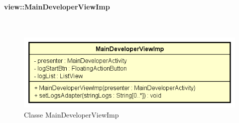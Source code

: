 \documentclass[../DefinizioneDiProdotto.tex]{subfiles}
\begin{document}
\paragraph{view::MainDeveloperViewImp}
\
\begin{figure}[H]
	\centering
	\includegraphics[width=\maxwidth]{img/MainDeveloperViewImp.png}
	\caption{Classe MainDeveloperViewImp}\label{fig:view::MainDeveloperViewImp} 
\end{figure}
\end{document}
